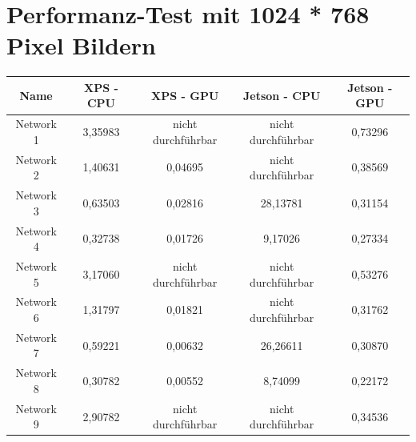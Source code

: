 \section{Performanz-Test mit 1024 * 768 Pixel Bildern}
\begin{table}[H]
    \centering
    \begin{tabular}{ |c|c|c|c|c| }
        \hline
        \textbf{Name} & \textbf{XPS - CPU} & \textbf{XPS - GPU} & \textbf{Jetson - CPU} & \textbf{Jetson - GPU}   \\ \hline
        Network  1 & 3,35983                                & \textcolor{danger}{nicht durchführbar} & \textcolor{danger}{nicht durchführbar} & 0,73296                                \\ \hline
        Network  2 & 1,40631                                & 0,04695                                & \textcolor{danger}{nicht durchführbar} & 0,38569                                \\ \hline
        Network  3 & 0,63503                                & 0,02816                                & 28,13781                               & 0,31154                                \\ \hline
        Network  4 & 0,32738                                & 0,01726                                & 9,17026                                & 0,27334                                \\ \hline
        Network  5 & 3,17060                                & \textcolor{danger}{nicht durchführbar} & \textcolor{danger}{nicht durchführbar} & 0,53276                                \\ \hline
        Network  6 & 1,31797                                & 0,01821                                & \textcolor{danger}{nicht durchführbar} & 0,31762                                \\ \hline
        Network  7 & 0,59221                                & 0,00632                                & 26,26611                               & 0,30870                                \\ \hline
        Network  8 & 0,30782                                & 0,00552                                & 8,74099                                & 0,22172                                \\ \hline
        Network  9 & 2,90782                                & \textcolor{danger}{nicht durchführbar} & \textcolor{danger}{nicht durchführbar} & 0,34536                                \\ \hline

\end{tabular}
\end{table}
